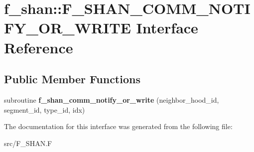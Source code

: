 \hypertarget{interfacef__shan_1_1F__SHAN__COMM__NOTIFY__OR__WRITE}{}\section{f\+\_\+shan\+:\+:F\+\_\+\+S\+H\+A\+N\+\_\+\+C\+O\+M\+M\+\_\+\+N\+O\+T\+I\+F\+Y\+\_\+\+O\+R\+\_\+\+W\+R\+I\+TE Interface Reference}
\label{interfacef__shan_1_1F__SHAN__COMM__NOTIFY__OR__WRITE}
\subsection*{Public Member Functions}
\begin{DoxyCompactItemize}
\item 
subroutine {\bfseries f\+\_\+shan\+\_\+comm\+\_\+notify\+\_\+or\+\_\+write} (neighbor\+\_\+hood\+\_\+id, segment\+\_\+id, type\+\_\+id, idx)\hypertarget{interfacef__shan_1_1F__SHAN__COMM__NOTIFY__OR__WRITE_acd6c661ea077a26a3ea31d8bbc9c5e71}{}\label{interfacef__shan_1_1F__SHAN__COMM__NOTIFY__OR__WRITE_acd6c661ea077a26a3ea31d8bbc9c5e71}

\end{DoxyCompactItemize}


The documentation for this interface was generated from the following file\+:\begin{DoxyCompactItemize}
\item 
src/F\+\_\+\+S\+H\+A\+N.\+F\end{DoxyCompactItemize}
